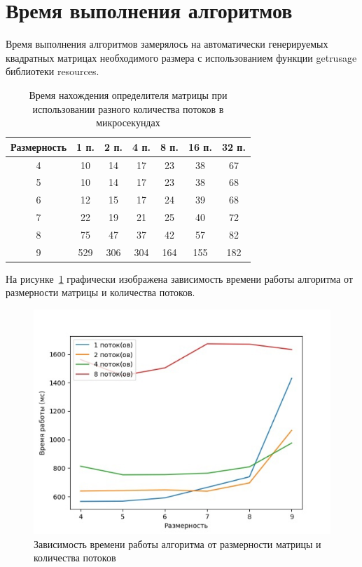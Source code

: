 \documentclass[12pt]{report}
\begin{document}
    \section{Время выполнения алгоритмов}

    Время выполнения алгоритмов замерялось на автоматически генерируемых
    квадратных матрицах необходимого размера с использованием функции getrusage библиотеки resources.

    \begin{table}[h]
        \begin{center}
            \captionsetup{justification=raggedright, singlelinecheck=false}
            \caption{\label{time} Время нахождения определителя матрицы при
            использовании разного количества потоков в микросекундах}
            \begin{tabular}{|c c c c c c c|}
                \hline
                Размерность & 1 п. & 2 п. & 4 п. & 8 п. & 16 п. & 32 п.
                \\
                \hline
                4 & 10  & 14  & 17  & 23  & 38  & 67  \\
                \hline
                5 & 10  & 14  & 17  & 23  & 38  & 68  \\
                \hline
                6 & 12  & 15  & 17  & 24  & 39  & 68  \\
                \hline
                7 & 22  & 19  & 21  & 25  & 40  & 72  \\
                \hline
                8 & 75  & 47  & 37  & 42  & 57  & 82  \\
                \hline
                9 & 529 & 306 & 304 & 164 & 155 & 182 \\
                \hline
            \end{tabular}
        \end{center}
    \end{table}

    На рисунке~\ref{img:graph} графически изображена зависимость
    времени работы алгоритма от размерности матрицы и количества потоков.

    \begin{figure}[H]
        \centering
        \includegraphics[width=0.8\linewidth]{img/graph}
        \caption{
            Зависимость времени работы алгоритма от размерности матрицы и количества потоков
        }
        \label{img:graph}
    \end{figure}
\end{document}
